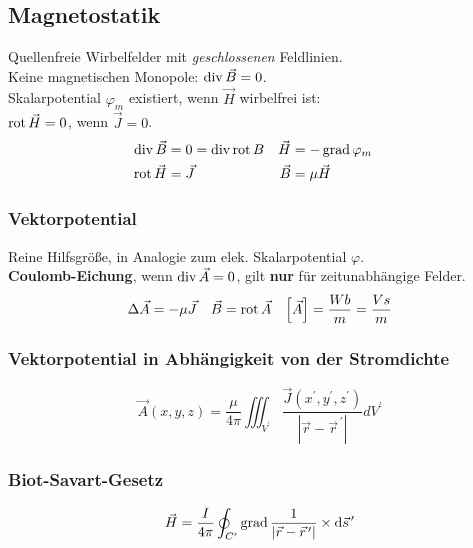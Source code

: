 \subsection{Magnetostatik}
Quellenfreie Wirbelfelder mit \textit{geschlossenen} Feldlinien.\\
Keine magnetischen Monopole: $\operatorname{div} \vec{B} = 0$.\\
Skalarpotential $ \varphi_m$ existiert, wenn $\vec{H}$ wirbelfrei ist:\\
$\operatorname{rot} \vec{H} = 0$, wenn $ \vec{J}=0$. 
\begin{align*}
	\operatorname{div} \vec{B} & = 0 = \operatorname{div} \operatorname{rot} B & \vec{H} & = -\operatorname{grad} \varphi_m &\\
	\operatorname{rot} \vec{H} & = \vec{J} & \vec{B} & = \mu \vec{H} &
\end{align*}
\subsubsection{Vektorpotential}
Reine Hilfsgröße, in Analogie zum elek. Skalarpotential $ \varphi $.\\
\textbf{Coulomb-Eichung}, wenn $ \operatorname{div} \vec{A} = 0 $, gilt \textbf{nur} für zeitunabhängige Felder.
\begin{align*}
    \Delta \vec{A} & = - \mu \vec{J} &
    \vec{B}        & = \operatorname{rot} \vec{A} &
    \left[\vec{A} \right] = \frac{Wb}{m} = \frac{Vs}{m}
\end{align*}

\subsubsection{Vektorpotential in Abhängigkeit von der Stromdichte}
\[
    \vec{A}(x, y, z)=\frac{\mu}{4 \pi} \iiint_{V^{\prime}} \frac{\vec{J}\left(x^{\prime}, y^{\prime}, z^{\prime}\right)}{\left|\vec{r}-\vec{r}^{\,\prime}\right|} d V^{\prime}
\]

\subsubsection{Biot-Savart-Gesetz}
\[
    \vec{H}=\frac{I}{4 \pi} \oint_{C^{\prime}} \operatorname{grad} \frac{1}{\left|\vec{r}-\vec{r}^{\,\prime}\right|} \times \mathrm{d} \vec{s}^{\,\prime}
\]

